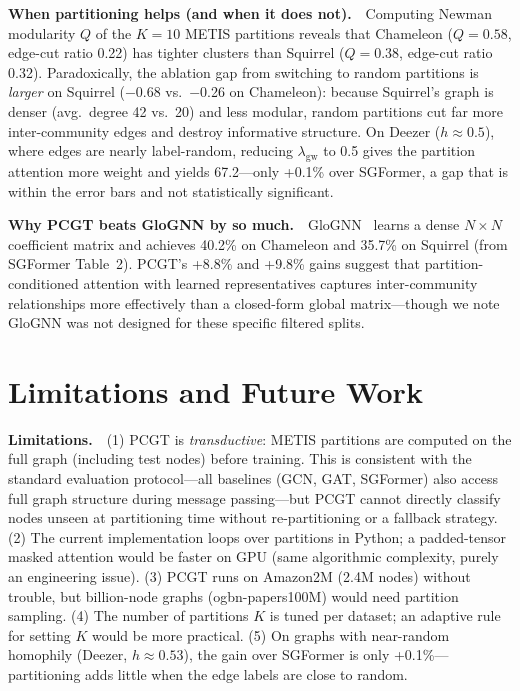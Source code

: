 \documentclass[sigconf]{acmart}
\begin{document}
\textbf{When partitioning helps (and when it does not).}~~Computing Newman modularity $Q$ of the $K\!=\!10$ METIS partitions reveals that Chameleon ($Q=0.58$, edge-cut ratio 0.22) has tighter clusters than Squirrel ($Q=0.38$, edge-cut ratio 0.32). Paradoxically, the ablation gap from switching to random partitions is \emph{larger} on Squirrel ($-$0.68 vs.\ $-$0.26 on Chameleon): because Squirrel's graph is denser (avg.\ degree 42 vs.\ 20) and less modular, random partitions cut far more inter-community edges and destroy informative structure. On Deezer ($h \approx 0.5$), where edges are nearly label-random, reducing $\lambda_{\text{gw}}$ to 0.5 gives the partition attention more weight and yields 67.2---only +0.1\% over SGFormer, a gap that is within the error bars and not statistically significant.

\textbf{Why PCGT beats GloGNN by so much.}~~GloGNN~\citep{li2022glognn} learns a dense $N \times N$ coefficient matrix and achieves 40.2\% on Chameleon and 35.7\% on Squirrel (from SGFormer Table~2). PCGT's +8.8\% and +9.8\% gains suggest that partition-conditioned attention with learned representatives captures inter-community relationships more effectively than a closed-form global matrix---though we note GloGNN was not designed for these specific filtered splits.

\section{Limitations and Future Work}

\textbf{Limitations.}~~(1) PCGT is \emph{transductive}: METIS partitions are computed on the full graph (including test nodes) before training. This is consistent with the standard evaluation protocol---all baselines (GCN, GAT, SGFormer) also access full graph structure during message passing---but PCGT cannot directly classify nodes unseen at partitioning time without re-partitioning or a fallback strategy. (2) The current implementation loops over partitions in Python; a padded-tensor masked attention would be faster on GPU (same algorithmic complexity, purely an engineering issue). (3) PCGT runs on Amazon2M (2.4M nodes) without trouble, but billion-node graphs (ogbn-papers100M) would need partition sampling. (4) The number of partitions $K$ is tuned per dataset; an adaptive rule for setting $K$ would be more practical. (5) On graphs with near-random homophily (Deezer, $h \approx 0.53$), the gain over SGFormer is only +0.1\%---partitioning adds little when the edge labels are close to random.
\end{document}
